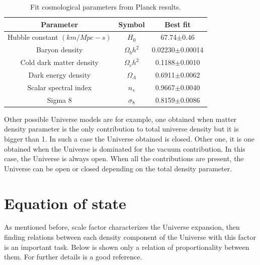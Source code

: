 \begin{table}
\begin{center}
  \begin{tabular}{ | c | c | c |}
    \hline \hline
    Parameter & Symbol & Best fit \\ \hline \hline 
    Hubble constant $(km/Mpc-s)$ & $H_0$ & 67.74$\pm$0.46 \\ \hline
    Baryon density & $\Omega_b h^2$ &  0.02230$\pm$0.00014 \\ \hline
    Cold dark matter density & $\Omega_c h^2$ & 0.1188$\pm$0.0010 \\  \hline
    Dark energy density & $\Omega_\Lambda$ & 0.6911$\pm$0.0062 \\ \hline
    Scalar spectral index & $n_s$ & 0.9667$\pm$0.0040 \\ \hline
    Sigma 8 & $\sigma_8$& 0.8159$\pm$0.0086 \\ \hline
  \end{tabular}
    \caption{ Fit cosmological parameters from Planck results\cite{planck}.}
  \label{plancktable}
\end{center}
\end{table}

Other possible Universe models are for example, one obtained when matter
density parameter is the only contribution to total universe density but 
it is bigger than 1. In such a case the Universe obtained is closed. 
Other one, it is one obtained when the Universe is dominated for the vacuum
contribution. In this case, the Universe is always open. When all the 
contributions are present, the Universe can be open or closed depending on the
total density parameter. 
		
\section{ Equation of state }

As mentioned before, scale factor characterizes the Universe expansion, 
then finding relations between each density component of the Universe 
with this factor is an important task. Below is shown only a relation of proportionality 
between them. For further details \cite{padma} is a good reference. 

\

